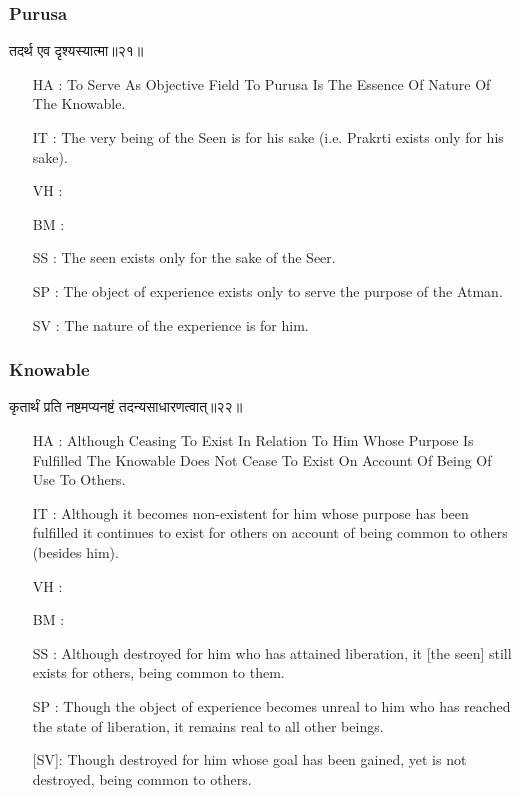 \begin{frame}[fragile]\frametitle{Purusa}
\begin{sanskrit}
तदर्थ एव दृश्यस्यात्मा॥२१॥
\end{sanskrit}

	\begin{itemize}
	\item [HA]: To Serve As Objective Field To Purusa Is The Essence Of Nature Of The Knowable.
	\item [IT]: The very being of the Seen is for his sake (i.e. Prakrti exists only for his sake).
	\item [VH]: 
	\item [BM]: 
	\item [SS]: The seen exists only for the sake of the Seer.
	\item [SP]: The object of experience exists only to serve the purpose of the Atman.
	\item [SV]: The nature of the experience is for him. 
	\end{itemize}
\end{frame}


\begin{frame}[fragile]\frametitle{Knowable}
\begin{sanskrit}
कृतार्थं प्रति नष्टमप्यनष्टं तदन्यसाधारणत्वात्॥२२॥
\end{sanskrit}

	\begin{itemize}
	\item [HA]: Although Ceasing To Exist In Relation To Him Whose Purpose Is Fulfilled The Knowable Does Not Cease To Exist On Account Of Being Of Use To Others.
	\item [IT]: Although it becomes non-existent for him whose purpose has been fulfilled it continues to exist for others on account of being common to others (besides him).
	\item [VH]: 
	\item [BM]: 
	\item [SS]: Although destroyed for him who has attained liberation, it [the seen] still exists for others, being common to them.
	\item [SP]: Though the object of experience becomes unreal to him who has reached the state of liberation, it remains real to all other beings.

[SV]: Though destroyed for him whose goal has been gained, yet is not destroyed, being common to others. 
	\end{itemize}
\end{frame}


